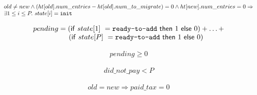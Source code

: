 \begin{lemma}
  \begin{equation*}
    \begin{array}{l}
      old \neq new \wedge (\mbox{$ht[old]$}.num\_entries - \mbox{$ht[old]$}.num\_to\_migrate) = 0 \wedge \mbox{$ht[new]$}.num\_entries = 0 \Rightarrow \\
      \exists 1 \leq i \leq P.~state[i] = \mbox{\texttt{init}}
    \end{array}
  \end{equation*}
  \label{one_thread_at_init_state_after_migration}
\end{lemma}


\begin{lemma}
  \begin{equation*}
\begin{array}{l}        
  pending = (\mathsf{if}~state[1]~=\mbox{\texttt{ready-to-add}}~ \mathsf{then}~1~\mathsf{else}~0) + \ldots + \\
   \quad \quad \quad \quad \quad (\mathsf{if}~state[P]~= \mbox{\texttt{ready-to-add}}~ \mathsf{then}~1~\mathsf{else}~0)
\end{array}
\end{equation*}  
  \label{pending}
\end{lemma}  

\begin{lemma}
  \begin{equation*}
\begin{array}{l}        
  pending \geq 0
\end{array}
\end{equation*}  
  \label{pending_lb}
\end{lemma}  


\begin{lemma}
  \begin{equation*}
\begin{array}{l}        
  did\_not\_pay < P
\end{array}
  \end{equation*}  
  \label{did_not_pay_ub}    
\end{lemma}  

\begin{lemma}
  \begin{equation*}
\begin{array}{l}        
  old = new \Rightarrow paid\_tax = 0
\end{array}
  \end{equation*} 
  \label{paid_tax0}    
\end{lemma}  

